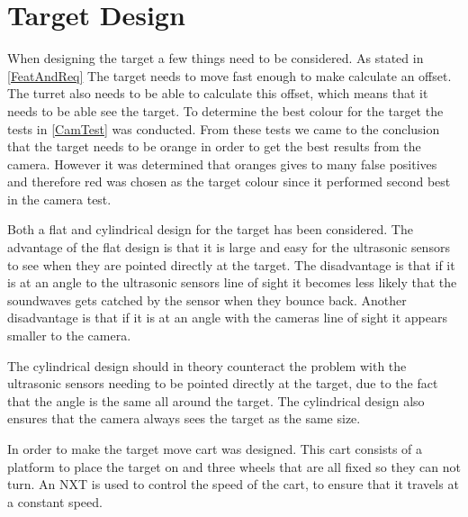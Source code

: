 \section{Target Design}
When designing the target a few things need to be considered. As stated in
\autoref{FeatAndReq} The target needs to move fast enough to make \name
calculate an offset. The turret also needs to be able to calculate this offset,
which means that it needs to be able see the target. To determine the
best colour for the target the tests in \autoref{CamTest} was conducted. From
these tests we came to the conclusion that the target needs to be orange in
order to get the best results from the camera.
However it was determined that oranges gives to many false positives and
therefore red was chosen as the target colour since it performed second best in
the camera test.\nl

Both a flat and cylindrical design for the target has been considered. The
advantage of the flat design is that it is large and easy for the ultrasonic
sensors to see when they are pointed directly at the target. The disadvantage
is that if it is at an angle to the ultrasonic sensors line of sight it 
becomes less likely that the soundwaves gets catched by the sensor when they
bounce back. Another disadvantage is that if it is at an angle with the
cameras line of sight it appears smaller to the camera.\nl

The cylindrical design should in theory counteract the problem with the
ultrasonic sensors needing to be pointed directly at the target, due to the
fact that the angle is the same all around the target. The cylindrical design
also ensures that the camera always sees the target as the same size.\nl

In order to make the target move cart was designed. This cart consists of a
platform to place the target on and three wheels that are all fixed so they can
not turn. An NXT is used to control the speed of the cart, to ensure that it
travels at a constant speed.



